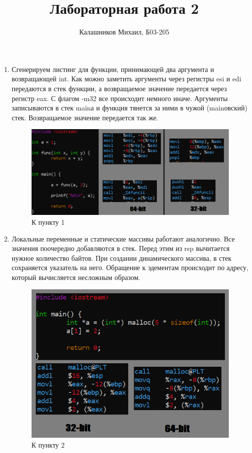 \documentclass[a4paper,12pt]{article}
\title{Лабораторная работа 2}
\author{Калашников Михаил, Б03-205}
\date{}
\begin{document}

\begin{enumerate}

\setcounter{enumi}{0}

\item Сгенерируем листинг для функции, принимающей два аргумента и возвращающей int. Как можно заметить аргументы через регистры esi и edi передаются в стек функции, а возвращаемое значение передается через регистр eax. С флагом -m32 все происходит немного иначе. Аргументы записываются в стек mainа и функция тянется за ними в чужой (mainовский) стек. Возвращаемое значение передается так же.

\begin{figure}[H]
  \centering
  \includegraphics[width=0.8\linewidth]{images/asm2_1.png}
  \caption{К пункту 1}
\end{figure}

\item Локальные переменные и статические массивы работают аналогично. Все значения поочередно добавляются в стек. Перед этим из rsp вычитается нужное количество байтов. При создании динамического массива, в стек сохраняется указатель на него. Обращение к эдементам происходит по адресу, который вычисляется несложным образом.

\begin{figure}[H]
  \centering
  \includegraphics[width=0.8\linewidth]{images/asm2_2.png}
  \caption{К пункту 2}
\end{figure}


\end{enumerate}
\end{document}
